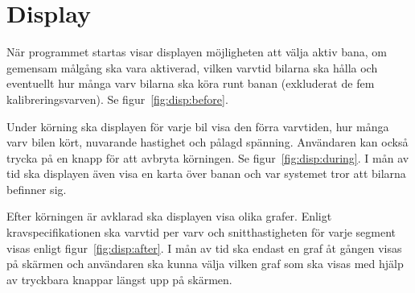 \section{Display}

När programmet startas visar displayen möjligheten att välja aktiv bana, om
gemensam målgång ska vara aktiverad, vilken varvtid bilarna ska hålla och
eventuellt hur många varv bilarna ska köra runt banan (exkluderat de fem
kalibreringsvarven). Se figur~\ref{fig:disp:before}.

Under körning ska displayen för varje bil visa den förra varvtiden, hur många
varv bilen kört, nuvarande hastighet och pålagd spänning. Användaren kan också
trycka på en knapp för att avbryta körningen. Se figur~\ref{fig:disp:during}. I
mån av tid ska displayen även visa en karta över banan och var systemet tror
att bilarna befinner sig.

Efter körningen är avklarad ska displayen visa olika grafer. Enligt
kravspecifikationen ska varvtid per varv och snitthastigheten för varje segment
visas enligt figur~\ref{fig:disp:after}. I mån av tid ska endast en graf åt
gången visas på skärmen och användaren ska kunna välja vilken graf som ska
visas med hjälp av tryckbara knappar längst upp på skärmen.

